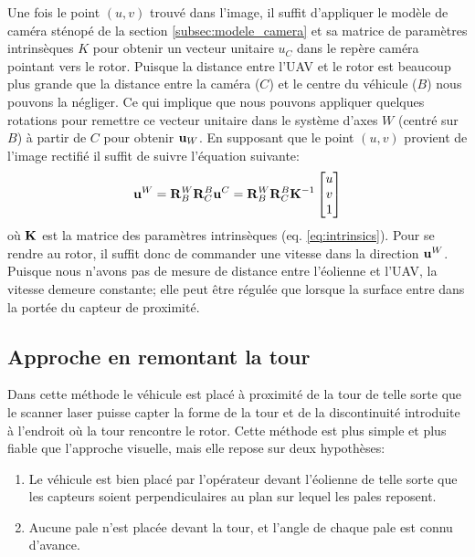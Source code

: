 Une fois le point $(u,v)$ trouvé dans l'image, il suffit d'appliquer le modèle de caméra sténopé de la section \ref{subsec:modele_camera} et sa matrice de paramètres intrinsèques $K$ pour obtenir un vecteur unitaire $u_C$ dans le repère caméra pointant vers le rotor. Puisque la distance entre l'UAV et le rotor est beaucoup plus grande que la distance entre la caméra ($C$) et le centre du véhicule ($B$) nous pouvons la négliger. Ce qui implique que nous pouvons appliquer quelques rotations pour remettre ce vecteur unitaire dans le système d'axes $W$ (centré sur $B$) à partir de $C$ pour obtenir $\mathbf{u}_W$. En supposant que le point $(u,v)$ provient de l'image rectifié il suffit de suivre l'équation suivante:
\begin{align}
  \mathbf{u}^W = \mathbf{R}^W_B \mathbf{R}^B_C \mathbf{u}^C = \mathbf{R}^W_B \mathbf{R}^B_C \mathbf{K}^{-1} \begin{bmatrix}u \\ v \\ 1\end{bmatrix}
\end{align}
où $\mathbf{K}$ est la matrice des paramètres intrinsèques (eq. \ref{eq:intrinsics}). Pour se rendre au rotor, il suffit donc de commander une vitesse dans la direction $\mathbf{u}^W$. Puisque nous n'avons pas de mesure de distance entre l'éolienne et l'UAV, la vitesse demeure constante; elle peut être régulée que lorsque la surface entre dans la portée du capteur de proximité.

\subsection{Approche en remontant la tour}
\label{subsec:laser_tower}

Dans cette méthode le véhicule est placé à proximité de la tour de telle sorte que le scanner laser puisse capter la forme de la tour et de la discontinuité introduite à l'endroit où la tour rencontre le rotor. Cette méthode est plus simple et plus fiable que l'approche visuelle, mais elle repose sur deux hypothèses:
\begin{enumerate}
  \item Le véhicule est bien placé par l'opérateur devant l'éolienne de telle sorte que les capteurs soient perpendiculaires au plan sur lequel les pales reposent.
  \item Aucune pale n'est placée devant la tour, et l'angle de chaque pale est connu d'avance.
\end{enumerate}

